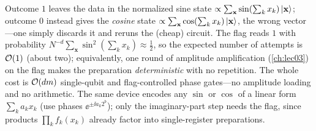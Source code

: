 \begin{example}
\begin{center}
\begin{quantikz}
\end{quantikz}
\end{center}
Outcome $1$ leaves the data in the normalized sine state
$\propto\sum_{\mathbf x}\sin(\sum_k x_k)\ket{\mathbf x}$; outcome $0$ instead gives the
\emph{cosine} state $\propto\sum_{\mathbf x}\cos(\sum_k x_k)\ket{\mathbf x}$, the wrong
vector---one simply discards it and reruns the (cheap) circuit. The flag reads $1$ with
probability $N^{-d}\sum_{\mathbf x}\sin^2(\sum_k x_k)\approx\tfrac12$, so the expected
number of attempts is $\mathcal{O}(1)$ (about two); equivalently, one round of amplitude
amplification (\cref{ch:lec03}) on the flag makes the preparation \emph{deterministic}
with no repetition. The whole cost is $\mathcal{O}(dm)$ single-qubit and
flag-controlled phase gates---no amplitude loading and no arithmetic. The same device
encodes any $\sin$ or $\cos$ of a linear form $\sum_k a_k x_k$ (use phases
$\ee^{\pm\ii a_k2^b}$); only the imaginary-part step needs the flag, since products
$\prod_k f_k(x_k)$ already factor into single-register preparations.
\end{example}

